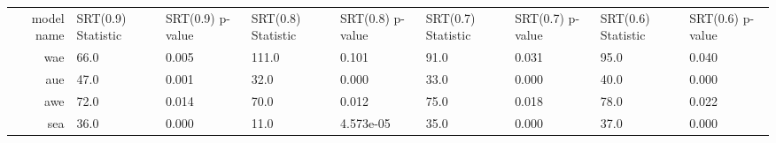 \begin{tabular}{|r|l|l|l|l|l|l|l|l|}
  \hline
  model name & SRT(0.9) Statistic & SRT(0.9) p-value & SRT(0.8) Statistic & SRT(0.8) p-value & SRT(0.7) Statistic & SRT(0.7) p-value & SRT(0.6) Statistic & SRT(0.6) p-value \\ 
  wae & 66.0 & 0.005 & 111.0 & 0.101 & 91.0 & 0.031 & 95.0 & 0.040 \\ 
  aue & 47.0 & 0.001 & 32.0 & 0.000 & 33.0 & 0.000 & 40.0 & 0.000 \\ 
  awe & 72.0 & 0.014 & 70.0 & 0.012 & 75.0 & 0.018 & 78.0 & 0.022 \\ 
  sea & 36.0 & 0.000 & 11.0 & 4.573e-05 & 35.0 & 0.000 & 37.0 & 0.000 \\ 
\end{tabular}
